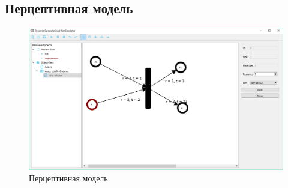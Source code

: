 		\FloatBarrier
		\clearpage
		\subsection{Перцептивная модель}
		
			\begin{figure}[th]
				\centering
				\includegraphics[width=\linewidth]{images/percept}
				\caption{Перцептивная модель}
				\label{fig:percept}
			\end{figure}
